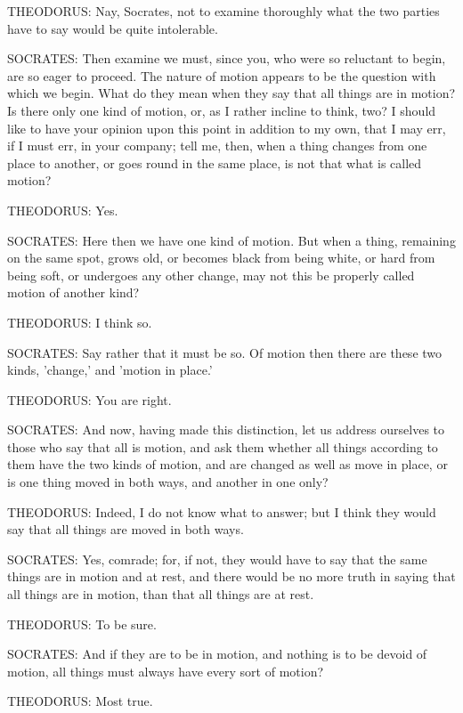 THEODORUS: Nay, Socrates, not to examine thoroughly what the two parties
have to say would be quite intolerable.

SOCRATES: Then examine we must, since you, who were so reluctant to
begin, are so eager to proceed. The nature of motion appears to be the
question with which we begin. What do they mean when they say that all
things are in motion? Is there only one kind of motion, or, as I rather
incline to think, two? I should like to have your opinion upon this
point in addition to my own, that I may err, if I must err, in your
company; tell me, then, when a thing changes from one place to another,
or goes round in the same place, is not that what is called motion?

THEODORUS: Yes.

SOCRATES: Here then we have one kind of motion. But when a thing,
remaining on the same spot, grows old, or becomes black from being
white, or hard from being soft, or undergoes any other change, may not
this be properly called motion of another kind?

THEODORUS: I think so.

SOCRATES: Say rather that it must be so. Of motion then there are these
two kinds, 'change,' and 'motion in place.'

THEODORUS: You are right.

SOCRATES: And now, having made this distinction, let us address
ourselves to those who say that all is motion, and ask them whether all
things according to them have the two kinds of motion, and are changed
as well as move in place, or is one thing moved in both ways, and
another in one only?

THEODORUS: Indeed, I do not know what to answer; but I think they would
say that all things are moved in both ways.

SOCRATES: Yes, comrade; for, if not, they would have to say that the
same things are in motion and at rest, and there would be no more truth
in saying that all things are in motion, than that all things are at
rest.

THEODORUS: To be sure.

SOCRATES: And if they are to be in motion, and nothing is to be devoid
of motion, all things must always have every sort of motion?

THEODORUS: Most true.

